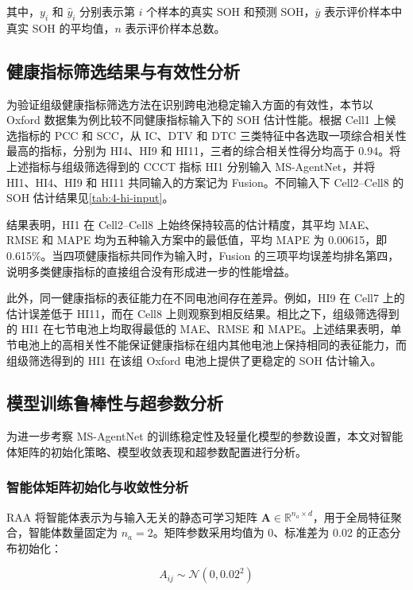 其中，$y_i$ 和 $\hat{y}_i$ 分别表示第 $i$ 个样本的真实 SOH 和预测 SOH，$\bar{y}$ 表示评价样本中真实 SOH 的平均值，$n$ 表示评价样本总数。

\subsection{健康指标筛选结果与有效性分析}

为验证组级健康指标筛选方法在识别跨电池稳定输入方面的有效性，本节以 Oxford 数据集为例比较不同健康指标输入下的 SOH 估计性能。根据 Cell1 上候选指标的 PCC 和 SCC，从 IC、DTV 和 DTC 三类特征中各选取一项综合相关性最高的指标，分别为 HI4、HI9 和 HI11，三者的综合相关性得分均高于 0.94。将上述指标与组级筛选得到的 CCCT 指标 HI1 分别输入 MS-AgentNet，并将 HI1、HI4、HI9 和 HI11 共同输入的方案记为 Fusion。不同输入下 Cell2--Cell8 的 SOH 估计结果见\cref{tab:4-hi-input}。

结果表明，HI1 在 Cell2--Cell8 上始终保持较高的估计精度，其平均 MAE、RMSE 和 MAPE 均为五种输入方案中的最低值，平均 MAPE 为 0.00615，即 0.615\%。当四项健康指标共同作为输入时，Fusion 的三项平均误差均排名第四，说明多类健康指标的直接组合没有形成进一步的性能增益。

此外，同一健康指标的表征能力在不同电池间存在差异。例如，HI9 在 Cell7 上的估计误差低于 HI11，而在 Cell8 上则观察到相反结果。相比之下，组级筛选得到的 HI1 在七节电池上均取得最低的 MAE、RMSE 和 MAPE。上述结果表明，单节电池上的高相关性不能保证健康指标在组内其他电池上保持相同的表征能力，而组级筛选得到的 HI1 在该组 Oxford 电池上提供了更稳定的 SOH 估计输入。


\subsection{模型训练鲁棒性与超参数分析}

为进一步考察 MS-AgentNet 的训练稳定性及轻量化模型的参数设置，本文对智能体矩阵的初始化策略、模型收敛表现和超参数配置进行分析。

\subsubsection{智能体矩阵初始化与收敛性分析}

RAA 将智能体表示为与输入无关的静态可学习矩阵 $\mathbf A\in\mathbb R^{n_a\times d}$，用于全局特征聚合，智能体数量固定为 $n_a=2$。矩阵参数采用均值为 0、标准差为 0.02 的正态分布初始化：

\begin{equation}
\label{eq:agent_initialization}
A_{ij}\sim\mathcal N\!\left(0,0.02^2\right)
\end{equation}

